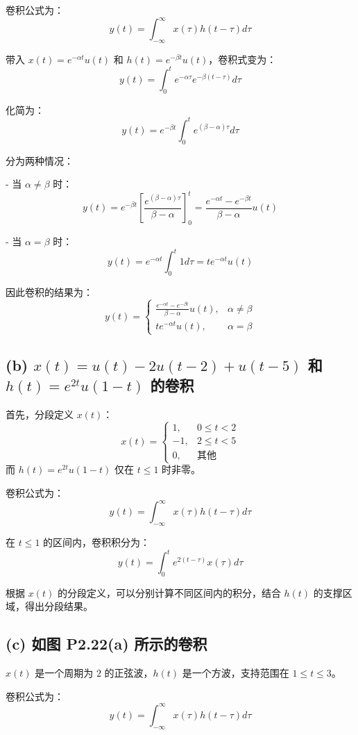\documentclass[UTF8]{report}
\theoremstyle{MyLineTheoremStyle} %
\theoremstyle{MyBlockTheoremStyle} %
\theoremstyle{MySubsubsectionStyle} %
\begin{document}
卷积公式为：
\[
y(t) = \int_{-\infty}^{\infty} x(\tau) h(t - \tau) d\tau
\]

带入 $x(t) = e^{-\alpha t} u(t)$ 和 $h(t) = e^{-\beta t} u(t)$，卷积式变为：
\[
y(t) = \int_0^t e^{-\alpha \tau} e^{-\beta (t - \tau)} d\tau
\]

化简为：
\[
y(t) = e^{-\beta t} \int_0^t e^{(\beta - \alpha) \tau} d\tau
\]

分为两种情况：

- 当 $\alpha \neq \beta$ 时：
  \[
  y(t) = e^{-\beta t} \left[ \frac{e^{(\beta - \alpha) \tau}}{\beta - \alpha} \right]_0^t = \frac{e^{-\alpha t} - e^{-\beta t}}{\beta - \alpha} u(t)
  \]

- 当 $\alpha = \beta$ 时：
  \[
  y(t) = e^{-\alpha t} \int_0^t 1 d\tau = t e^{-\alpha t} u(t)
  \]

因此卷积的结果为：
\[
y(t) =
\begin{cases}
\frac{e^{-\alpha t} - e^{-\beta t}}{\beta - \alpha} u(t), & \alpha \neq \beta \\
t e^{-\alpha t} u(t), & \alpha = \beta
\end{cases}
\]

\subsection*{(b) $x(t) = u(t) - 2u(t-2) + u(t-5)$ 和 $h(t) = e^{2t} u(1-t)$ 的卷积}

首先，分段定义 $x(t)$：
\[
x(t) =
\begin{cases}
1, & 0 \leq t < 2 \\
-1, & 2 \leq t < 5 \\
0, & \text{其他}
\end{cases}
\]
而 $h(t) = e^{2t} u(1 - t)$ 仅在 $t \leq 1$ 时非零。

卷积公式为：
\[
y(t) = \int_{-\infty}^{\infty} x(\tau) h(t - \tau) d\tau
\]

在 $t \leq 1$ 的区间内，卷积积分为：
\[
y(t) = \int_0^t e^{2(t - \tau)} x(\tau) d\tau
\]

根据 $x(t)$ 的分段定义，可以分别计算不同区间内的积分，结合 $h(t)$ 的支撑区域，得出分段结果。

\subsection*{(c) 如图 P2.22(a) 所示的卷积}

$x(t)$ 是一个周期为 $2$ 的正弦波，$h(t)$ 是一个方波，支持范围在 $1 \leq t \leq 3$。

卷积公式为：
\[
y(t) = \int_{-\infty}^{\infty} x(\tau) h(t - \tau) d\tau
\]
\end{document}
